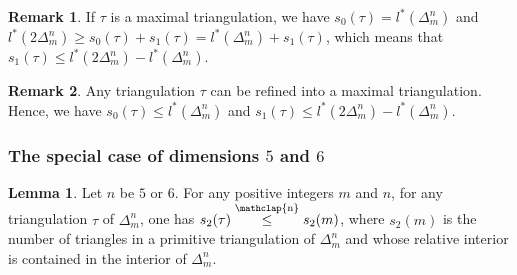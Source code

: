 \documentclass[12pt]{article}
\newcommand\customleq{\stackrel{\mathclap{\normalfont\scriptsize\mbox{n}}}{\leq}}
\theoremstyle{definition}
\newtheorem{lem}{Lemma}[section]
\newtheorem{rmk}{Remark}[section]
\begin{document}



\begin{rmk}
    If $\tau$ is a maximal triangulation, we have $s_0(\tau) = l^*(\Delta_m^n)$ and $l^*(2\Delta_m^n) \geq s_0(\tau) + s_1(\tau) = l^*(\Delta_m^n) + s_1(\tau)$, which means that $s_1(\tau) \leq l^*(2\Delta_m^n) - l^*(\Delta_m^n)$.
\end{rmk}

\begin{rmk}
    \label{rmk_nombre_segments}
    Any triangulation $\tau$ can be refined into a maximal triangulation. Hence, we have $s_0(\tau) \leq l^*(\Delta_m^n)$ and $s_1(\tau) \leq l^*(2\Delta_m^n) - l^*(\Delta_m^n)$.
\end{rmk}

\subsubsection{The special case of dimensions $5$ and $6$}

\begin{lem}
    \label{lemma_dehn_sommerville}
    Let $n$ be $5$ or $6$. For any positive integers $m$ and $n$, for any triangulation $\tau$ of $\Delta_m^n$, one has $s_2(\tau) \customleq s_2(m)$, where $s_2(m)$ is the number of triangles in a primitive triangulation of $\Delta_m^n$ and whose relative interior is contained in the interior of $\Delta_m^n$.
\end{lem}
\end{document}

